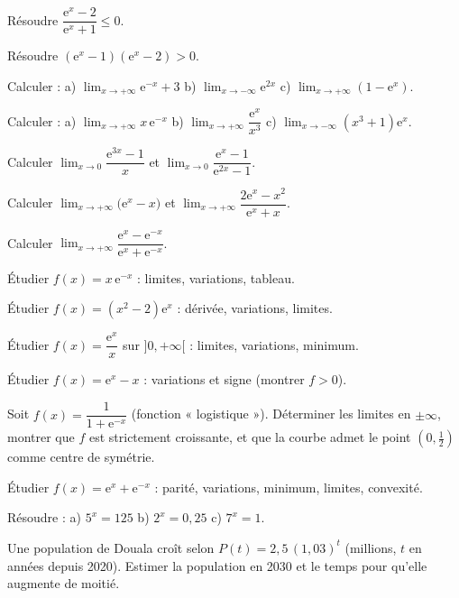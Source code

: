 \exo{} Résoudre $\dfrac{\mathrm{e}^{x}-2}{\mathrm{e}^{x}+1}\le 0$.

\exo{} Résoudre $(\mathrm{e}^{x}-1)(\mathrm{e}^{x}-2)>0$.

\exo{} Calculer : a) $\displaystyle\lim_{x\to+\infty}\mathrm{e}^{-x}+3$ \quad
b) $\displaystyle\lim_{x\to-\infty}\mathrm{e}^{2x}$ \quad
c) $\displaystyle\lim_{x\to+\infty}(1-\mathrm{e}^{x})$.

\exo{} Calculer : a) $\displaystyle\lim_{x\to+\infty}x\,\mathrm{e}^{-x}$ \quad
b) $\displaystyle\lim_{x\to+\infty}\dfrac{\mathrm{e}^{x}}{x^{3}}$ \quad
c) $\displaystyle\lim_{x\to-\infty}(x^{3}+1)\mathrm{e}^{x}$.

\exo{} Calculer $\displaystyle\lim_{x\to0}\dfrac{\mathrm{e}^{3x}-1}{x}$ et
$\displaystyle\lim_{x\to0}\dfrac{\mathrm{e}^{x}-1}{\mathrm{e}^{2x}-1}$.

\exo{} Calculer $\displaystyle\lim_{x\to+\infty}\big(\mathrm{e}^{x}-x\big)$ et
$\displaystyle\lim_{x\to+\infty}\dfrac{2\mathrm{e}^{x}-x^{2}}{\mathrm{e}^{x}+x}$.

\exo{} Calculer $\displaystyle\lim_{x\to+\infty}\dfrac{\mathrm{e}^{x}-\mathrm{e}^{-x}}{\mathrm{e}^{x}+\mathrm{e}^{-x}}$.

\exo{} Étudier $f(x)=x\,\mathrm{e}^{-x}$ : limites, variations, tableau.

\exo{} Étudier $f(x)=(x^{2}-2)\mathrm{e}^{x}$ : dérivée, variations, limites.

\exo{} Étudier $f(x)=\dfrac{\mathrm{e}^{x}}{x}$ sur $]0,+\infty[$ : limites, variations,
minimum.

\exo{} Étudier $f(x)=\mathrm{e}^{x}-x$ : variations et signe (montrer $f>0$).

\exo{} Soit $f(x)=\dfrac{1}{1+\mathrm{e}^{-x}}$ (fonction « logistique »). Déterminer
les limites en $\pm\infty$, montrer que $f$ est strictement croissante, et que la courbe
admet le point $(0,\tfrac12)$ comme centre de symétrie.

\exo{} Étudier $f(x)=\mathrm{e}^{x}+\mathrm{e}^{-x}$ : parité, variations, minimum,
limites, convexité.

\exo{} Résoudre : a) $5^{x}=125$ \quad b) $2^{x}=0{,}25$ \quad c) $7^{x}=1$.

\exo{} Une population de Douala croît selon $P(t)=2{,}5\,(1{,}03)^{t}$ (millions, $t$ en
années depuis 2020). Estimer la population en 2030 et le temps pour qu'elle augmente de moitié.

